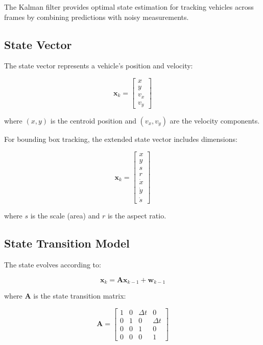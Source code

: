 \documentclass[12pt,a4paper]{report}
\begin{document}
The Kalman filter provides optimal state estimation for tracking vehicles across frames by combining predictions with noisy measurements.

\subsection{State Vector}

The state vector represents a vehicle's position and velocity:

\begin{equation}
\mathbf{x}_k =
\begin{bmatrix}
x \\ y \\ v_x \\ v_y
\end{bmatrix}
\end{equation}

where $(x, y)$ is the centroid position and $(v_x, v_y)$ are the velocity components.

For bounding box tracking, the extended state vector includes dimensions:

\begin{equation}
\mathbf{x}_k =
\begin{bmatrix}
x \\ y \\ s \\ r \\ \dot{x} \\ \dot{y} \\ \dot{s}
\end{bmatrix}
\end{equation}

where $s$ is the scale (area) and $r$ is the aspect ratio.

\subsection{State Transition Model}

The state evolves according to:

\begin{equation}
\mathbf{x}_k = \mathbf{A} \mathbf{x}_{k-1} + \mathbf{w}_{k-1}
\end{equation}

where $\mathbf{A}$ is the state transition matrix:

\begin{equation}
\mathbf{A} =
\begin{bmatrix}
1 & 0 & \Delta t & 0 \\
0 & 1 & 0 & \Delta t \\
0 & 0 & 1 & 0 \\
0 & 0 & 0 & 1
\end{bmatrix}
\end{equation}
\end{document}
